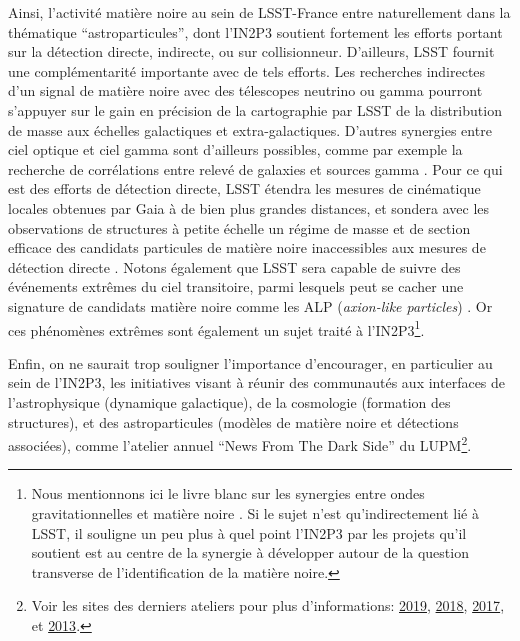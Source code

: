 \documentclass[12pt]{article}
\begin{document}
Ainsi, l'activité matière noire au sein de LSST-France entre naturellement dans la thématique ``astroparticules'', dont l'IN2P3 soutient fortement les efforts portant sur la détection directe, indirecte, ou sur collisionneur. D'ailleurs, LSST fournit une complémentarité importante avec de tels efforts. Les recherches indirectes d'un signal de matière noire avec des télescopes neutrino ou gamma \citep{Charles:2016,Albert:2017,1404.5503} pourront s'appuyer sur le gain en précision de la cartographie par LSST de la distribution de masse aux échelles galactiques et extra-galactiques. D'autres synergies entre ciel optique et ciel gamma sont d'ailleurs possibles, comme par exemple la recherche de corrélations entre relevé de galaxies et sources gamma \citep{2019arXiv190713484A}.
Pour ce qui est des efforts de détection directe, LSST étendra les mesures de cinématique locales obtenues par Gaia à de bien plus grandes distances, et sondera avec les observations de structures à petite échelle un régime de masse et de section efficace des candidats particules de matière noire inaccessibles aux mesures de détection directe \citep{drlica-wagner_2019_lsst_dark_matter}.
Notons également que LSST sera capable de suivre des événements extrêmes du ciel transitoire, parmi lesquels peut se cacher une signature de candidats matière noire comme les ALP ({\it axion-like particles}) \citep{2017PhRvL.118a1103M}. Or ces phénomènes extrêmes sont également un sujet traité à l'IN2P3\footnote{Nous mentionnons ici le livre blanc sur les synergies entre ondes gravitationnelles et matière noire \citep{2019arXiv190710610B}. Si le sujet n'est qu'indirectement lié à LSST, il souligne un peu plus à quel point l'IN2P3 par les projets qu'il soutient est au centre de la synergie à développer autour de la question transverse de l'identification de la matière noire.}.

Enfin, on ne saurait trop souligner l'importance d'encourager, en particulier au sein de l'IN2P3, les initiatives visant à réunir des communautés aux interfaces de l'astrophysique (dynamique galactique), de la cosmologie (formation des structures), et des astroparticules (modèles de matière noire et détections associées), comme l'atelier annuel ``News From The Dark Side'' du LUPM\footnote{Voir les sites des derniers ateliers pour plus d'informations: \href{https://indico.in2p3.fr/event/19035/}{2019}, \href{https://indico.in2p3.fr/event/17224/}{2018}, \href{https://indico.in2p3.fr/event/14497/}{2017}, et \href{https://indico.in2p3.fr/event/9143/}{2013}.}. 
\end{document}
